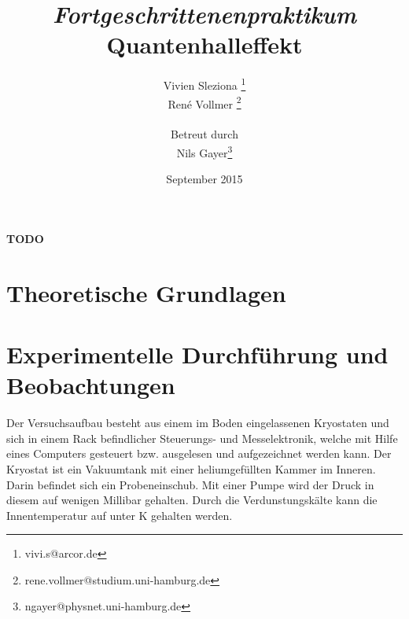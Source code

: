 \documentclass[12pt,a4paper]{article}
\begin{document}
	
	\textbf{TODO}
	
	
	
	\title{\textit{Fortgeschrittenenpraktikum}\\\textbf{Quantenhalleffekt} }
	\date{September 2015}
	\author{Vivien Sleziona \footnote{vivi.s@arcor.de}\\ René Vollmer \footnote{rene.vollmer@studium.uni-hamburg.de} \\ \\Betreut durch\\ Nils Gayer\footnote{ngayer@physnet.uni-hamburg.de}}
	
	\maketitle
	
	\begin{center} 
		\bigskip
		\bigskip
		
		\begin{minipage}{0.75\textwidth}
			
		\end{minipage}
	\end{center}
	
	\newpage
	
	\tableofcontents
	\vfill
	\newpage
	\clearpage	
	
	
	\section{Theoretische Grundlagen}
	
	

	
	\newpage
	\clearpage
	
	\section{Experimentelle Durchführung und Beobachtungen}
	Der Versuchsaufbau besteht aus einem im Boden eingelassenen Kryostaten und sich in einem Rack befindlicher Steuerungs- und Messelektronik, welche mit Hilfe eines Computers gesteuert bzw. ausgelesen und aufgezeichnet werden kann. Der Kryostat ist ein Vakuumtank mit einer heliumgefüllten Kammer im Inneren. Darin befindet sich ein Probeneinschub. Mit einer Pumpe wird der Druck in diesem auf wenigen Millibar gehalten. Durch die Verdunstungskälte kann die Innentemperatur auf unter \unit[1,5]{K} gehalten werden.
	
\end{document}
